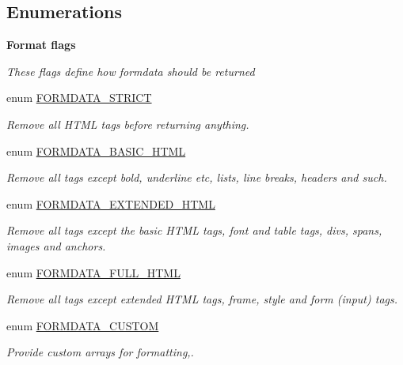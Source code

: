 \subsection*{Enumerations}
\begin{Indent}{\bf Format flags}\par
{\em \label{_amgrpa4a8ad1564033c02db773a1b5aa004f6}
 These flags define how formdata should be returned }\begin{DoxyCompactItemize}
\item 
enum \hyperlink{class_8formhandler_8php_af5de9385d7f7fc802eaa8e7090d8e0f5}{FORMDATA\_\-STRICT} 
\begin{DoxyCompactList}\small\item\em Remove all HTML tags before returning anything. \item\end{DoxyCompactList}\item 
enum \hyperlink{class_8formhandler_8php_a274bb2c8e23d075b189f143adbb6746e}{FORMDATA\_\-BASIC\_\-HTML} 
\begin{DoxyCompactList}\small\item\em Remove all tags except bold, underline etc, lists, line breaks, headers and such. \item\end{DoxyCompactList}\item 
enum \hyperlink{class_8formhandler_8php_ac2f81495783870a3c4a63ab0164aa412}{FORMDATA\_\-EXTENDED\_\-HTML} 
\begin{DoxyCompactList}\small\item\em Remove all tags except the basic HTML tags, font and table tags, divs, spans, images and anchors. \item\end{DoxyCompactList}\item 
enum \hyperlink{class_8formhandler_8php_ac1497f65ec29dadf9d39c5da41e17fc3}{FORMDATA\_\-FULL\_\-HTML} 
\begin{DoxyCompactList}\small\item\em Remove all tags except extended HTML tags, frame, style and form (input) tags. \item\end{DoxyCompactList}\item 
enum \hyperlink{class_8formhandler_8php_ae5bb66ec27c03f3b03796f3bd80ba2ff}{FORMDATA\_\-CUSTOM} 
\begin{DoxyCompactList}\small\item\em Provide custom arrays for formatting,. \item\end{DoxyCompactList}\item 

\end{DoxyCompactItemize}
\end{Indent}
